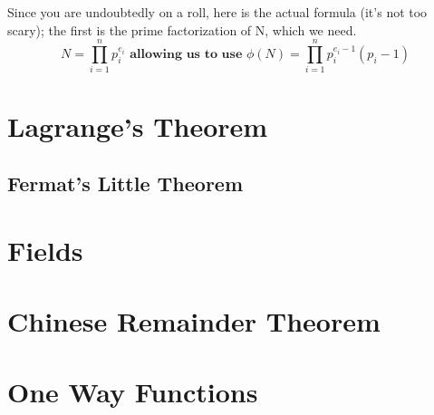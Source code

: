     Since you are undoubtedly on a roll, here is the actual formula (it's not too scary); the first is the prime factorization of N, which we need.\\

    $$N = \prod_{i=1}^{n}p_{i}^{e_{i}} \textbf{ allowing us to use } \phi(N) = \prod_{i=1}^{n}p_{i}^{e_{i}-1}(p_{i} - 1)$$


    \section{Lagrange's Theorem}
    
        \subsection{Fermat's Little Theorem}
        
    \section{Fields}
    
    \section{Chinese Remainder Theorem}
    
    \section{One Way Functions}
    
